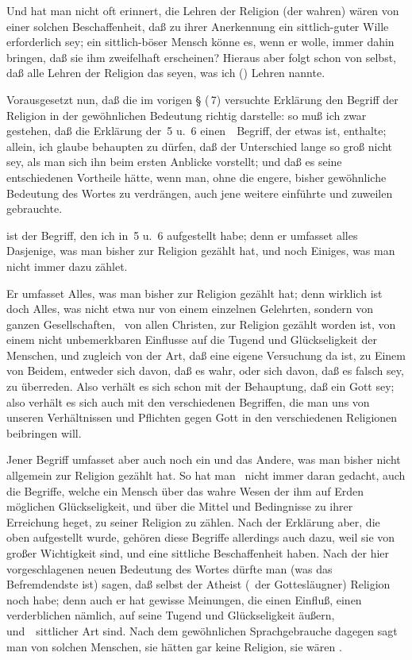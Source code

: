 \begin{aufza}
\begin{aufzb}
\item Und hat man nicht oft erinnert, die Lehren der Religion (der wahren) wären von einer solchen Beschaffenheit, daß zu ihrer Anerkennung ein sittlich-guter Wille erforderlich sey; ein sittlich-böser Mensch könne es, wenn er wolle, immer dahin bringen, daß sie ihm zweifelhaft erscheinen? Hieraus aber folgt schon von selbst, daß alle Lehren der Religion das seyen, was ich ()  Lehren nannte.
\end{aufzb}
\item Vorausgesetzt nun, daß die im vorigen § (\no\,7) versuchte Erklärung den Begriff der Religion in der gewöhnlichen Bedeutung richtig darstelle: so muß ich zwar gestehen, daß die Erklärung der \no\,5 u.\ 6 einen~\ Begriff, der etwas  ist, enthalte; allein, ich glaube behaupten zu dürfen, daß der Unterschied lange so groß nicht sey, als man sich ihn beim ersten Anblicke vorstellt; und daß es seine entschiedenen Vortheile hätte, wenn man, ohne die engere, bisher gewöhnliche Bedeutung des Wortes zu verdrängen, auch jene weitere einführte und zuweilen gebrauchte. 
\item {} ist der Begriff, den ich in \no\,5 u.\ 6 aufgestellt habe; denn er umfasset alles Dasjenige, was man bisher zur Religion gezählt hat, und noch Einiges, was man nicht immer dazu zählet.
\begin{aufzb}
\item Er umfasset Alles, was man bisher zur Religion gezählt hat; denn wirklich ist doch Alles, was nicht etwa nur von einem einzelnen Gelehrten, sondern von ganzen Gesellschaften, \zB\ von allen Christen, zur Religion gezählt worden ist, von einem nicht unbemerkbaren Einflusse auf die Tugend und Glückseligkeit der Menschen, und zugleich von der Art, daß eine eigene Versuchung da ist, zu Einem von Beidem, entweder sich davon, daß es wahr, oder sich davon, daß es falsch sey, zu überreden. Also verhält es sich schon mit der Behauptung, daß ein Gott sey; also verhält es sich auch mit den verschiedenen Begriffen, die man uns von unseren Verhältnissen und Pflichten gegen Gott in den verschiedenen Religionen beibringen will.
\item Jener Begriff umfasset aber auch noch ein und das Andere, was man bisher nicht allgemein zur Religion gezählt hat. So hat man \zB\ nicht immer daran gedacht, auch die Begriffe, welche ein Mensch über das wahre Wesen der ihm auf Erden möglichen Glückseligkeit, und über die Mittel und Bedingnisse zu ihrer Erreichung heget, zu seiner Religion zu zählen. Nach der Erklärung aber, die oben aufgestellt wurde, gehören diese Begriffe allerdings auch dazu, weil sie von großer Wichtigkeit sind, und eine sittliche Beschaffenheit haben. Nach der hier vorgeschlagenen neuen Bedeutung des Wortes dürfte man (was das Befremdendste ist) sagen, daß selbst der Atheist (\dh\ der Gottesläugner) Religion noch habe; denn auch er hat gewisse Meinungen, die einen Einfluß, einen verderblichen nämlich, auf seine Tugend und Glückseligkeit äußern, und~\ sittlicher Art sind. Nach dem gewöhnlichen Sprachgebrauche dagegen sagt man von solchen Menschen, sie hätten gar keine Religion, sie wären .

\end{aufzb}
\end{aufza}
